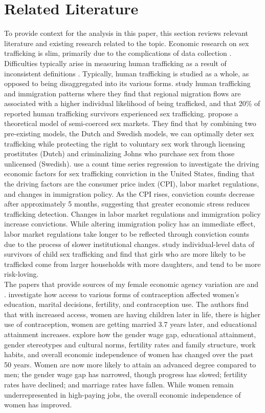 \section{Related Literature}
To provide context for the analysis in this paper, this section reviews relevant literature and existing research related to the topic. Economic research on sex trafficking is slim, primarily due to the complications of data collection \citep{Kristiina}. Difficulties typically arise in measuring human trafficking as a result of inconsistent definitions \citep{Hanson}. Typically, human trafficking is studied as a whole, as opposed to being disaggregated into its various forms. \cite{omar} study human trafficking and immigration patterns where they find that regional migration flows are associated with a higher individual likelihood of being trafficked, and that 20\% of reported human trafficking survivors experienced sex trafficking. \cite{leeandpersson} propose a theoretical model of semi-coerced sex markets. They find that by combining two pre-existing models, the Dutch and Swedish models, we can optimally deter sex trafficking while protecting the right to voluntary sex work through licensing prostitutes (Dutch) and criminalizing Johns who purchase sex from those unlicensed (Swedish). \cite{Jang} use a count time series regression to investigate the driving economic factors for sex trafficking conviction in the United States, finding that the driving factors are the consumer price index (CPI), labor market regulations, and changes in immigration policy. As the CPI rises, conviction counts decrease after approximately 5 months, suggesting that greater economic stress reduces trafficking detection. Changes in labor market regulations and immigration policy increase convictions. While altering immigration policy has an immediate effect, labor market regulations take longer to be reflected through conviction counts due to the process of slower institutional changes. \cite{Nyqviststiina} study individual-level data of survivors of child sex trafficking and find that girls who are more likely to be trafficked come from larger households with more daughters, and tend to be more risk-loving. \\
\indent The papers that provide sources of my female economic agency variation are \cite{baileyandlindo} and \cite{baileyanddiprete}. \cite{baileyandlindo} investigate how access to various forms of contraception affected women’s education, marital decisions, fertility, and contraception use. The authors find that with increased access, women are having children later in life, there is higher use of contraception, women are getting married 3.7 years later, and educational attainment increases. \cite{baileyanddiprete} explore how the gender wage gap, educational attainment, gender stereotypes and cultural norms, fertility rates and family structure, work habits, and overall economic independence of women has changed over the past 50 years. Women are now more likely to attain an advanced degree compared to men; the gender wage gap has narrowed, though progress has slowed; fertility rates have declined; and marriage rates have fallen. While women remain underrepresented in high-paying jobs, the overall economic independence of women has improved.
